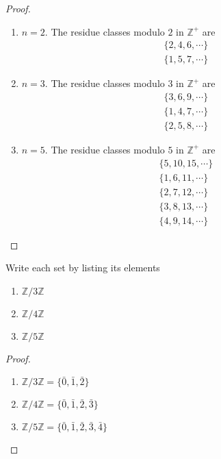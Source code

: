 \begin{proof}
    \begin{enumerate}[label={\textbf{\alph*.}},itemsep=0pt]
        \item $n = 2$. The residue classes modulo $2$ in $\mathbb{Z}^{+}$ are
              \[
                  \begin{split}
                      \{ 2, 4, 6, \cdots \} \\
                      \{ 1, 5, 7, \cdots \}
                  \end{split}
              \]
        \item $n = 3$. The residue classes modulo $3$ in $\mathbb{Z}^{+}$ are
              \[
                  \begin{split}
                      \{ 3, 6, 9, \cdots \} \\
                      \{ 1, 4, 7, \cdots \} \\
                      \{ 2, 5, 8, \cdots \}
                  \end{split}
              \]
        \item $n = 5$. The residue classes modulo $5$ in $\mathbb{Z}^{+}$ are
              \[
                  \begin{split}
                      \{ 5, 10, 15, \cdots \} \\
                      \{ 1, 6, 11, \cdots \} \\
                      \{ 2, 7, 12, \cdots \} \\
                      \{ 3, 8, 13, \cdots \} \\
                      \{ 4, 9, 14, \cdots \}
                  \end{split}
              \]
    \end{enumerate}
\end{proof}

\newpage
\begin{exercise}
    Write each set by listing its elements
    \begin{enumerate}[label={\textbf{\alph*.}}]
        \item $\mathbb{Z}/3\mathbb{Z}$
        \item $\mathbb{Z}/4\mathbb{Z}$
        \item $\mathbb{Z}/5\mathbb{Z}$
    \end{enumerate}
\end{exercise}

\begin{proof}
    \begin{enumerate}[label={\textbf{\alph*.}}]
        \item $\mathbb{Z}/3\mathbb{Z} = \{ \bar{0}, \bar{1}, \bar{2} \}$
        \item $\mathbb{Z}/4\mathbb{Z} = \{ \bar{0}, \bar{1}, \bar{2}, \bar{3} \}$
        \item $\mathbb{Z}/5\mathbb{Z} = \{ \bar{0}, \bar{1}, \bar{2}, \bar{3}, \bar{4} \}$
    \end{enumerate}
\end{proof}

